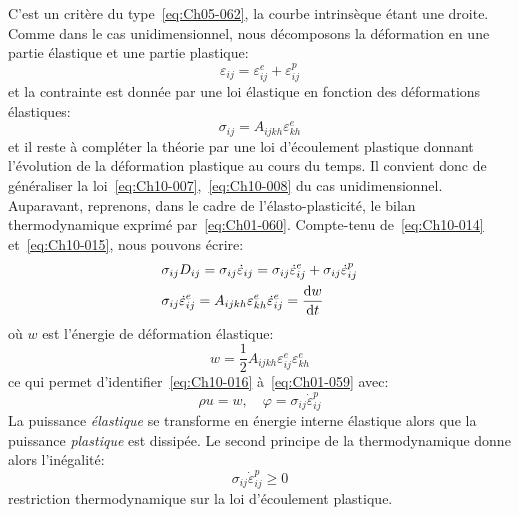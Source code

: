 C'est un critère du type~\eqref{eq:Ch05-062}, la courbe intrinsèque étant une droite. 
Comme dans le cas unidimensionnel, nous décomposons la déformation 
en une partie élastique et une partie plastique: 
\begin{equation}
    \varepsilon_{ij} = \varepsilon_{ij}^e + \varepsilon_{ij}^p
    \label{eq:Ch10-014}
\end{equation}
et la contrainte est donnée par une loi élastique en fonction des déformations élastiques: 
\begin{equation}
    \sigma_{ij} = A_{ijkh} \varepsilon_{kh}^e
    \label{eq:Ch10-015}
\end{equation}
et il reste à compléter la théorie par une loi d'écoulement plastique donnant l'évolution de la déformation plastique au cours du temps.
Il convient donc de généraliser la loi~\eqref{eq:Ch10-007},~\eqref{eq:Ch10-008} du cas unidimensionnel.
Auparavant, reprenons, dans le cadre de l'élasto-plasticité, le bilan thermodynamique exprimé par~\eqref{eq:Ch01-060}.
Compte-tenu de~\eqref{eq:Ch10-014} et~\eqref{eq:Ch10-015}, nous pouvons écrire: 
\begin{equation}
    \begin{aligned}
        & \sigma_{ij} D_{ij} = \sigma_{ij} \dot{\varepsilon}_{ij} = \sigma_{ij} \dot{\varepsilon}_{ij}^e + \sigma_{ij} \dot{\varepsilon}_{ij}^p \\
        & \sigma_{ij} \dot{\varepsilon}_{ij}^e = A_{ijkh} \varepsilon_{kh}^e \dot{\varepsilon}_{ij}^e = \frac{\mathop{\mathrm{{}d}}\mathopen{} w}{\mathop{\mathrm{{}d}}\mathopen{} t}
    \end{aligned}
    \label{eq:Ch10-016}
\end{equation}
où $w$ est l'énergie de déformation élastique:
\begin{equation}
    w = \frac{1}{2} A_{ijkh} \varepsilon_{ij}^e \varepsilon_{kh}^e
    \label{eq:Ch10-017}
\end{equation}
ce qui permet d'identifier~\eqref{eq:Ch10-016} à~\eqref{eq:Ch01-059} avec: 
\begin{equation}
    \rho u = w ,\quad \varphi = \sigma_{ij} \dot{\varepsilon}_{ij}^p
    \label{eq:Ch10-018a}
\end{equation}
La puissance \emph{élastique} se transforme en énergie interne élastique alors que la puissance \emph{plastique} est dissipée.
Le second principe de la thermodynamique donne alors l'inégalité: 
\begin{equation}
    \sigma_{ij} \dot{\varepsilon}_{ij}^p \geq 0
    \label{eq:Ch10-018}
\end{equation}
restriction thermodynamique sur la loi d'écoulement plastique. 

